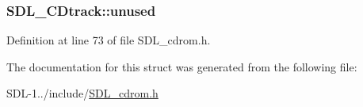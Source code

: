 \hypertarget{struct_s_d_l___c_dtrack_a2ec24a93792ff7a537f7554a89d596cf}{}
\subsubsection[{unused}]{ S\+D\+L\+\_\+\+C\+Dtrack\+::unused}\label{struct_s_d_l___c_dtrack_a2ec24a93792ff7a537f7554a89d596cf}


Definition at line 73 of file S\+D\+L\+\_\+cdrom.\+h.



The documentation for this struct was generated from the following file\+:\begin{DoxyCompactItemize}
\item 
S\+D\+L-\/1../include/\hyperlink{_s_d_l__cdrom_8h}{S\+D\+L\+\_\+cdrom.\+h}\end{DoxyCompactItemize}
